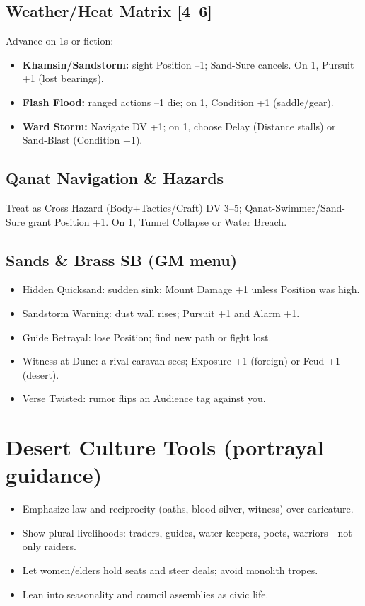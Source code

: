 \documentclass[11pt]{article}
\begin{document}
\subsection{Weather/Heat Matrix [4--6]}

Advance on 1s or fiction:
\begin{itemize}
\item \textbf{Khamsin/Sandstorm:} sight Position --1; Sand-Sure cancels. On 1, Pursuit +1 (lost bearings).
\item \textbf{Flash Flood:} ranged actions --1 die; on 1, Condition +1 (saddle/gear).
\item \textbf{Ward Storm:} Navigate DV +1; on 1, choose Delay (Distance stalls) or Sand-Blast (Condition +1).
\end{itemize}

\subsection{Qanat Navigation \& Hazards}

Treat as Cross Hazard (Body+Tactics/Craft) DV 3--5; Qanat-Swimmer/Sand-Sure grant Position +1. On 1, Tunnel Collapse or Water Breach.

\subsection{Sands \& Brass SB (GM menu)}
\begin{itemize}
\item Hidden Quicksand: sudden sink; Mount Damage +1 unless Position was high.
\item Sandstorm Warning: dust wall rises; Pursuit +1 and Alarm +1.
\item Guide Betrayal: lose Position; find new path or fight lost.
\item Witness at Dune: a rival caravan sees; Exposure +1 (foreign) or Feud +1 (desert).
\item Verse Twisted: rumor flips an Audience tag against you.
\end{itemize}

\section{Desert Culture Tools (portrayal guidance)}
\begin{itemize}
\item Emphasize law and reciprocity (oaths, blood-silver, witness) over caricature.
\item Show plural livelihoods: traders, guides, water-keepers, poets, warriors---not only raiders.
\item Let women/elders hold seats and steer deals; avoid monolith tropes.
\item Lean into seasonality and council assemblies as civic life.
\end{itemize}
\end{document}
